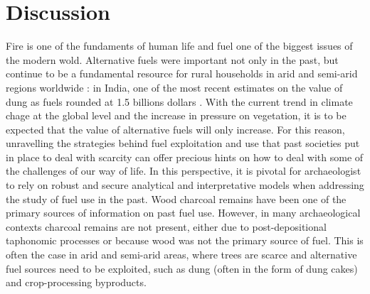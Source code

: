 \documentclass[authoryear,preprint,review,12pt]{elsarticle}
\begin{document}
\section{Discussion}
\label{sec:4}
Fire is one of the fundaments of human life and fuel one of the biggest issues of the modern wold. Alternative fuels were important not only in the past, but continue to be a fundamental resource for rural households in arid and semi-arid regions worldwide \citep{Viswanathan2005}: in India, one of the most recent estimates on the value of dung as fuels rounded at 1.5 billions dollars \citep{Harris2000}. With the current trend in climate chage at the global level and the increase in pressure on vegetation, it is to be expected that the value of alternative fuels will only increase. For this reason, unravelling the strategies behind fuel exploitation and use that past societies put in place to deal with scarcity can offer precious hints on how to deal with some of the challenges of our way of life. In this perspective, it is pivotal for archaeologist to rely on robust and secure analytical and interpretative models when addressing the study of fuel use in the past. Wood charcoal remains have been one of the primary sources of information on past fuel use. However, in many archaeological contexts charcoal remains are not present, either due to post-depositional taphonomic processes or because wood was not the primary source of fuel. This is often the case in arid and semi-arid areas, where trees are scarce and alternative fuel sources need to be exploited, such as dung (often in the form of dung cakes) and crop-processing byproducts.\par
\end{document}
